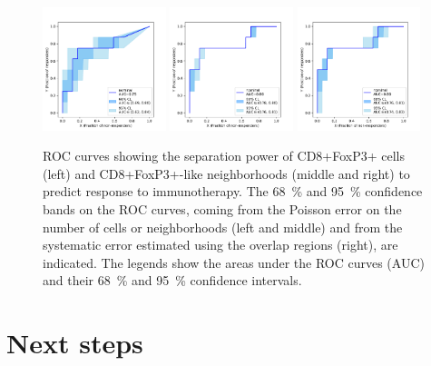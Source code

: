 \documentclass[11pt]{article}
\begin{document}
\begin{figure}
\begin{center}
\includegraphics[width=0.32\textwidth]{poisson_roc_cells.pdf}
\includegraphics[width=0.32\textwidth]{poisson_roc_neighborhoods.pdf}
\includegraphics[width=0.32\textwidth]{lognormal_roc_neighborhoods.pdf}
\caption{ROC curves \autocite{SITC2023poster} showing the separation power of CD8+FoxP3+ cells (left) and CD8+FoxP3+-like neighborhoods (middle and right) to predict response to immunotherapy.  The \qty{68}{\%} and \qty{95}{\%} confidence bands on the ROC curves, coming from the Poisson error on the number of cells or neighborhoods (left and middle) and from the systematic error estimated using the overlap regions (right), are indicated.  The legends show the areas under the ROC curves (AUC) and their \qty{68}{\%} and \qty{95}{\%} confidence intervals.}
\label{fig:exampleroc_systematics_mc}
\end{center}
\end{figure}

\section{Next steps}
\end{document}
